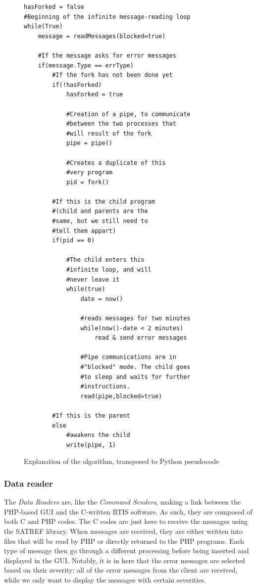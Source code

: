 \documentclass{themeensg}
\begin{document}
\begin{figure}[hb]
	\centering
	\lstset{language=Python}
 
	\begin{lstlisting}[frame=single]
hasForked = false
#Beginning of the infinite message-reading loop
while(True)	
	message = readMessages(blocked=true)
	
	#If the message asks for error messages
	if(message.Type == errType)
		#If the fork has not been done yet
		if(!hasForked)	
			hasForked = true
			
			#Creation of a pipe, to communicate
			#between the two processes that
			#will result of the fork
			pipe = pipe()
			
			#Creates a duplicate of this
			#very program
			pid = fork()
			
		#If this is the child program
		#(child and parents are the 
		#same, but we still need to
		#tell them appart)
		if(pid == 0)
		
			#The child enters this
			#infinite loop, and will
			#never leave it
			while(true)
				date = now()
				
				#reads messages for two minutes
				while(now()-date < 2 minutes)
					read & send error messages
					
				#Pipe communications are in 
				#"blocked" mode. The child goes
				#to sleep and waits for further
				#instructions.
				read(pipe,blocked=true)
				
		#If this is the parent
		else
			#awakens the child
			write(pipe, 1)				
	\end{lstlisting}
	\caption{Explanation of the algorithm, transposed to Python pseudocode}
	\label{fig:pseudocode}
\end{figure}

\subsubsection{Data reader}

The \textit{Data Readers} are, like the \textit{Command Senders}, making a link between the PHP-based GUI and the C-written RTIS software. As such, they are composed of both C and PHP codes. The C codes are just here to receive the messages using the SATREF library. When messages are received, they are either written into files that will be read by PHP or directly returned to the PHP programs.
Each type of message then go through a different processing before being inserted and displayed in the GUI. Notably, it is in here that the error messages are selected based on their severity: all of the error messages from the client are received, while we only want to display the messages with certain severities.
\end{document}
